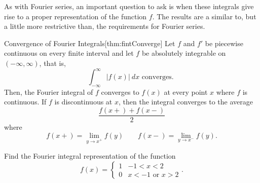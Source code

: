 As with Fourier series, an important question to ask is when these integrals give rise to a proper representation of the function $f$. The results are a similar to, but a little more restrictive than, the requirements for Fourier series.

\begin{theorem1}{Convergence of Fourier Integrals}[thm:fintConverge]
Let $f$ and $f'$ be piecewise continuous on every finite interval and let $f$ be absolutely integrable on $(-\infty, \infty)$, that is, \[ \int_{-\infty}^\infty |f(x)| \ dx \text{ converges. } \] Then, the Fourier integral of $f$ converges to $f(x)$ at every point $x$ where $f$ is continuous. If $f$ is discontinuous at $x$, then the integral converges to the average
\[ \frac{f(x+) + f(x-)}{2} \] where \[ f(x+) = \lim_{y \rightarrow x^+} f(y) \qquad f(x-) = \lim_{y \rightarrow x^-} f(y). \]
\end{theorem1}

\begin{example}
Find the Fourier integral representation of the function
\[ f(x) = \begin{cases}
1 & -1 < x < 2 \\
0 & x <-1 \text{ or } x > 2
\end{cases}.\]
\end{example}

